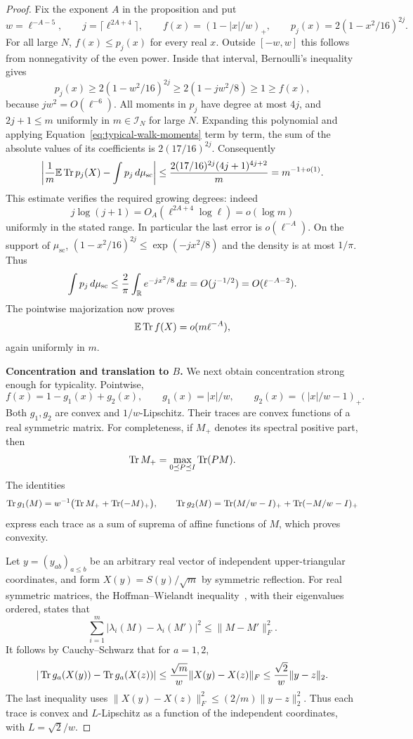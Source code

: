 \begin{proof}
Fix the exponent \(A\) in the proposition and put
\[
 w=\ell^{-A-5},\qquad j=\lceil\ell^{2A+4}\rceil,
 \qquad f(x)=(1-|x|/w)_+,
 \qquad p_j(x)=2(1-x^2/16)^{2j}.
\]
For all large \(N\), \(f(x)\le p_j(x)\) for every real \(x\).
Outside \([-w,w]\) this follows from nonnegativity of the even
power. Inside that interval, Bernoulli's inequality gives
\[
 p_j(x)\ge 2(1-w^2/16)^{2j}
       \ge 2(1-jw^2/8)\ge1\ge f(x),
\]
because \(jw^2=O(\ell^{-6})\). All moments in \(p_j\) have degree
at most \(4j\), and \(2j+1\le m\) uniformly in
\(m\in\mathcal I_N\) for large \(N\). Expanding this polynomial
and applying Equation~\eqref{eq:typical-walk-moments} term by term,
the sum of the absolute values of its coefficients is
\(2(17/16)^{2j}\). Consequently
\[
 \left|\frac1m\mathbb E\operatorname{Tr} p_j(X)
        -\int p_j\,d\mu_{\mathrm{sc}}\right|
 \le \frac{2(17/16)^{2j}(4j+1)^{4j+2}}{m}
 =m^{-1+o(1)}.
\]
This estimate verifies the required growing degrees: indeed
\[
 j\log(j+1)=O_A(\ell^{2A+4}\log\ell)=o(\log m)
\]
uniformly in the stated range. In particular the last error is
\(o(\ell^{-A})\). On the support of \(\mu_{\mathrm{sc}}\),
\((1-x^2/16)^{2j}\le\exp(-jx^2/8)\) and the density is at most
\(1/\pi\). Thus
\[
 \int p_j\,d\mu_{\mathrm{sc}}
 \le \frac2\pi\int_{\mathbb R}e^{-jx^2/8}\,dx
 =O(j^{-1/2})=O(\ell^{-A-2}).
\]
The pointwise majorization now proves
\begin{equation}\label{eq:typical-tent-mean}
 \mathbb E\operatorname{Tr} f(X)=o(m\ell^{-A}),
\end{equation}
again uniformly in \(m\).

\medskip\noindent\textbf{Concentration and translation to \(B\).}
We next obtain concentration strong enough for typicality. Pointwise,
\[
 f(x)=1-g_1(x)+g_2(x),\qquad
 g_1(x)=|x|/w,\qquad g_2(x)=(|x|/w-1)_+.
\]
Both \(g_1,g_2\) are convex and \(1/w\)-Lipschitz. Their traces are
convex functions of a real symmetric matrix. For completeness, if
\(M_+\) denotes its spectral positive part, then
\[
 \operatorname{Tr} M_+=\max_{0\preceq P\preceq I}\operatorname{Tr}(PM).
\]
The identities
\[
 \operatorname{Tr} g_1(M)=w^{-1}\bigl(\operatorname{Tr} M_++\operatorname{Tr}(-M)_+\bigr),\qquad
 \operatorname{Tr} g_2(M)=\operatorname{Tr}(M/w-I)_++\operatorname{Tr}(-M/w-I)_+
\]
express each trace as a sum of suprema of affine functions of \(M\),
which proves convexity.

Let \(y=(y_{ab})_{a\le b}\) be an arbitrary real vector of independent
upper-triangular coordinates, and form \(X(y)=S(y)/\sqrt m\) by
symmetric reflection. For real symmetric matrices, the
Hoffman--Wielandt inequality~\cite[Theorem~1 and Remark~2]{HoffmanWielandt}, with their
eigenvalues ordered, states that
\[
 \sum_{i=1}^m|\lambda_i(M)-\lambda_i(M')|^2
       \le\|M-M'\|_F^2.
\]
It follows by Cauchy--Schwarz that for \(a=1,2\),
\[
 |\operatorname{Tr} g_a(X(y))-\operatorname{Tr} g_a(X(z))|
 \le\frac{\sqrt m}{w}\|X(y)-X(z)\|_F
 \le\frac{\sqrt2}{w}\|y-z\|_2.
\]
The last inequality uses
\(\|X(y)-X(z)\|_F^2\le(2/m)\|y-z\|_2^2\).
Thus each trace is convex and \(L\)-Lipschitz as a function of the
independent coordinates, with \(L=\sqrt2/w\).


\end{proof}
